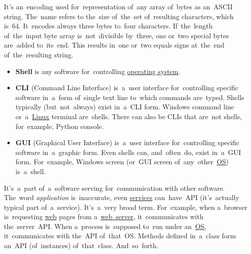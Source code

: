 \label{base64}
It's an~encoding used for~representation of~any array of~bytes as an~ASCII string.
The~name refers to the~size of~the~set of~resulting characters, which is~64.
It~encodes always three bytes to~four characters.
If~the~length of~the~input byte array is~not~divisible by~three, one or~two special bytes are~added to~its~end.
This results in~one or~two equals signs at~the~end of~the~resulting string.

\label{shellcligui}
\begin{itemize}
    \item \textbf{Shell} is any software for~controlling \hyperref[os]{operating system}.
    \item \textbf{CLI} (Command Line Interface) is~a~user interface for~controlling specific software in~a~form of~single text line to~which commands are~typed.
    Shells typically (but~not~always) exist in~a~CLI form.
    Windows command line or~a~\hyperref[linux]{Linux} terminal are~shells.
    There can also be CLIs that are~not shells, for~example, Python console.
    \item \textbf{GUI} (Graphical User Interface) is~a~user interface for~controlling specific software in~a~graphic form.
          Even shells can, and~often~do, exist in~a~GUI form.
          For~example, Windows screen (or~GUI screen of~any~other~\hyperref[os]{OS}) is~a~shell.
\end{itemize}

\label{api}
It's~a~part of~a~software serving for~communication with other software.
The~word \textit{application} is~inaccurate, even \hyperref[applicationprocessprogramservicethread]{services} can~have~API (it's~actually typical part of~a~service).
It's~a~very broad term.
For~example, when a~browser is~requesting \hyperref[internetweb]{web} pages from a~\hyperref[webserver]{web~server}, it~communicates with the~server~API.
When a~process is~supposed to~run under an~\hyperref[os]{OS}, it~communicates with the~API of~that~OS.
Methods defined in~a~class form an~API (of~instances) of~that~class.
And~so~forth.

